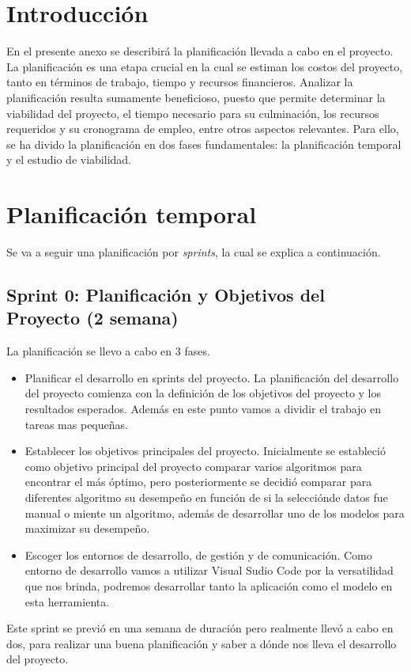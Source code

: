 
\section{Introducción}

En el presente anexo se describirá la planificación llevada a cabo en el proyecto. La planificación es una etapa crucial en la cual se estiman los costos del proyecto, tanto en términos de trabajo, tiempo y recursos financieros. Analizar la planificación resulta sumamente beneficioso, puesto que permite determinar la viabilidad del proyecto, el tiempo necesario para su culminación, los recursos requeridos y su cronograma de empleo, entre otros aspectos relevantes. Para ello, se ha divido la planificación en dos fases fundamentales: la planificación temporal y el estudio de viabilidad.

\section{Planificación temporal}

Se va a seguir una planificación por \textit{sprints}, la cual se explica a continuación.

\subsection{Sprint 0: Planificación y Objetivos del Proyecto (2 semana)}
La planificación se llevo a cabo en 3 fases.
\begin{itemize}
    \item
    Planificar el desarrollo en sprints del proyecto.
    La planificación del desarrollo del proyecto comienza con la definición de los objetivos del proyecto y los resultados esperados. Además en este punto vamos a dividir el trabajo en tareas mas pequeñas.
    \item
    Establecer los objetivos principales del proyecto.
    Inicialmente se estableció como objetivo principal del proyecto comparar varios algoritmos para encontrar el más óptimo, pero posteriormente se decidió comparar para diferentes algoritmo su desempeño en función de si la selecciónde datos fue manual o miente un algoritmo, además de desarrollar uno de los modelos para maximizar su desempeño.
    \item
    Escoger los entornos de desarrollo, de gestión y de comunicación.
    Como entorno de desarrollo vamos a utilizar Visual Sudio Code por la versatilidad que nos brinda, podremos desarrollar tanto la aplicación como el modelo en esta herramienta.
\end{itemize}
Este sprint se previó en una semana de duración pero realmente llevó a cabo en dos, para realizar una buena planificación y saber a dónde nos lleva el desarrollo del proyecto.

